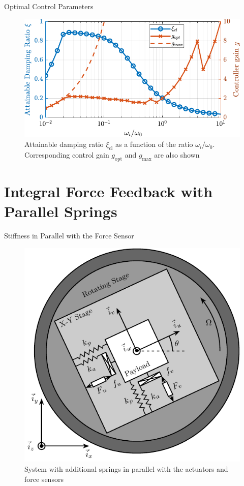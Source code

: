 \documentclass[t, minted]{clean-beamer}
\begin{document}
\begin{frame}[label={sec:orga2c2166}]{Optimal Control Parameters}
\vspace{1em}

\begin{figure}[htbp]
\centering
\includegraphics[width=\linewidth]{figs/mod_iff_damping_wi.pdf}
\caption{Attainable damping ratio \(\xi_\text{cl}\) as a function of the ratio \(\omega_i/\omega_0\). Corresponding control gain \(g_\text{opt}\) and \(g_\text{max}\) are also shown}
\end{figure}
\end{frame}

\section{Integral Force Feedback with Parallel Springs}
\label{sec:org7a61560}
\begin{frame}[label={sec:orga6be4f6}]{Stiffness in Parallel with the Force Sensor}
\begin{figure}[htbp]
\centering
\includegraphics[width=0.65\linewidth]{figs/system_parallel_springs.pdf}
\caption{System with additional springs in parallel with the actuators and force sensors}
\end{figure}
\end{frame}
\end{document}
